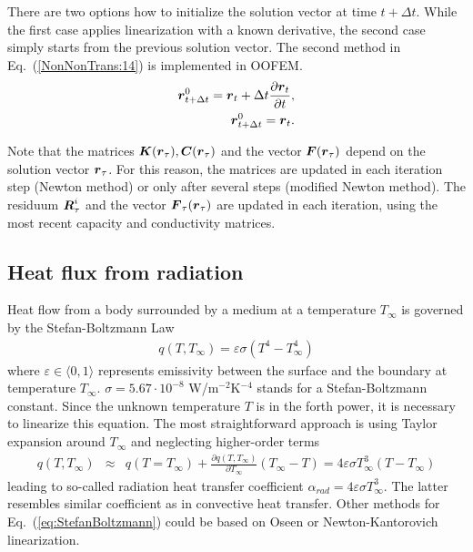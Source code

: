 \documentclass[a4paper]{article}
\newcommand{\mbf}[1]{\mbox{\boldmath$#1$}}
\newcommand{\refeq}[1]{Eq.~(\ref{#1})}
\begin{document}
There are two options how to initialize the solution vector at time $t + \Delta t$. While the first case applies linearization with a known derivative, the second case simply starts from the previous solution vector. The second method in \refeq{NonNonTrans:14} is implemented in OOFEM.
\begin{eqnarray}
\mbf{r}_{t+\Delta t}^{0} = \mbf{r}_t + \Delta t\frac{\partial{\mbf{r}_t}}{\partial t},\label{NonNonTrans:13}\\
\mbf{r}_{t+\Delta t}^{0} = \mbf{r}_t.\label{NonNonTrans:14}
\end{eqnarray}

Note that the matrices $\mbf{K}(\mbf{r}_\tau), \mbf{C}(\mbf{r}_\tau)$ and the vector $\mbf{F}(\mbf{r}_\tau)$ depend on the solution vector $\mbf{r}_\tau$. For this reason, the matrices are updated in each iteration step (Newton method) or only after several steps (modified Newton method). The residuum $\mbf{R}_\tau^{i}$ and the vector $\mbf{F}_\tau(\mbf{r}_\tau)$ are updated in each iteration, using the most recent capacity and conductivity matrices.

\subsection{Heat flux from radiation}

Heat flow from a body surrounded by a medium at a temperature $T_\infty$ is governed by the Stefan-Boltzmann Law
\begin{eqnarray}
q(T, T_\infty) = \varepsilon \sigma (T^4 - T_\infty^4)\label{eq:StefanBoltzmann}
\end{eqnarray}
where $\varepsilon\in\langle 0, 1 \rangle$ represents emissivity between the surface and the boundary at temperature $T_\infty$. $\sigma=5.67\cdot 10^{-8}$ W/m$^{-2}$K$^{-4}$ stands for a Stefan-Boltzmann constant. Since the unknown temperature $T$ is in the forth power, it is necessary to linearize this equation. The most straightforward approach is using Taylor expansion around $T_\infty$ and neglecting higher-order terms
\begin{eqnarray}
q(T, T_\infty) &\approx& q(T=T_\infty) + \frac{\partial q(T,T_\infty)}{\partial T_\infty} (T_\infty-T) = 4\varepsilon \sigma T_\infty^3 (T-T_\infty)
\end{eqnarray}
leading to so-called radiation heat transfer coefficient $\alpha_{rad}=4\varepsilon \sigma T_\infty^3$. The latter resembles similar coefficient as in convective heat transfer. Other methods for \refeq{eq:StefanBoltzmann} could be based on Oseen or Newton-Kantorovich linearization.
\end{document}
